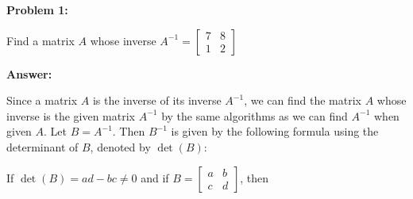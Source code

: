 \documentclass[10pt,letterpaper,final]{report}
\begin{document}
\begin{center}
  \vline
\end{center}

\medskip
\noindent\textbf{Problem 1:}
\medskip

Find a matrix $A$ whose inverse $A^{-1} = \begin{bmatrix}
    7 & 8 \\
    1 & 2
  \end{bmatrix}$

\medskip
\noindent\textbf{Answer:}
\medskip

Since a matrix $A$ is the inverse of its inverse $A^{-1}$, we can find the matrix $A$ whose inverse is the given matrix $A^{-1}$ by the same algorithms as we can find $A^{-1}$ when given $A$. Let $B = A^{-1}$. Then $B^{-1}$ is given by the following formula using the determinant of $B$, denoted by $\det(B)$:

If $\det(B) = ad - bc \ne 0$ and if $B=\begin{bmatrix}
    a & b \\
    c & d
  \end{bmatrix}$, then
\end{document}
